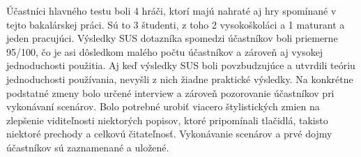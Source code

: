 Účastníci hlavného testu boli 4 hráči, ktorí majú nahraté aj hry spomínané v tejto bakalárskej práci. Sú to 3 študenti, z toho 2 vysokoškoláci a 1 maturant a jeden pracujúci. Výsledky SUS dotazníka spomedzi účastníkov boli priemerne 95/100, čo je asi dôsledkom malého počtu účastníkov a zároveň aj vysokej jednoduchosti použitia. Aj keď výsledky SUS boli povzbudzujúce a utvrdili teóriu jednoduchosti používania, nevyšli z nich žiadne praktické výsledky. Na konkrétne podstatné zmeny bolo určené interview a zároveň pozorovanie účastníkov pri vykonávaní scenárov. Bolo potrebné urobiť viacero štylistických zmien na zlepšenie viditeľnosti niektorých popisov, ktoré pripomínali tlačidlá, takisto niektoré prechody a celkovú čitateľnosť. Vykonávanie scenárov a prvé dojmy účastníkov sú zaznamenané a uložené.


